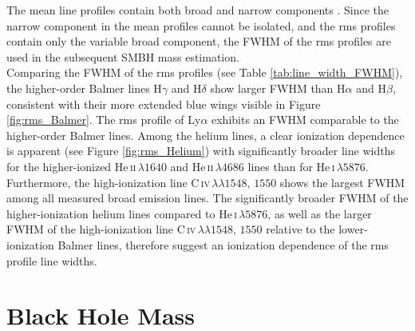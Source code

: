 The mean line profiles contain both broad and narrow components \parencite{peterson1997introduction}. Since the narrow component in the mean profiles cannot be isolated, and the rms profiles contain only the variable broad component, the FWHM of the rms profiles are used in the subsequent SMBH mass estimation.\\
Comparing the FWHM of the rms profiles (see Table \ref{tab:line_width_FWHM}), the higher-order Balmer lines H$\gamma$ and H$\delta$ show larger FWHM than H$\alpha$ and H$\beta$, consistent with their more extended blue wings visible in Figure \ref{fig:rms_Balmer}. The rms profile of Ly$\alpha$ exhibits an FWHM comparable to the higher-order Balmer lines. Among the helium lines, a clear ionization dependence is apparent (see Figure \ref{fig:rms_Helium}) with significantly broader line widths for the higher-ionized He\,\textsc{ii}\,$\lambda1640$ and He\,\textsc{ii}\,$\lambda4686$ lines than for He\,\textsc{i}\,$\lambda5876$. Furthermore, the high-ionization line C\,\textsc{iv}$\,\lambda\lambda 1548,\,1550$ shows the largest FWHM among all measured broad emission lines. The significantly broader FWHM of the higher-ionization helium lines compared to He\,\textsc{i}\,$\lambda5876$, as well as the larger FWHM of the high-ionization line C\,\textsc{iv}$\,\lambda\lambda 1548,\,1550$ relative to the lower-ionization Balmer lines, therefore suggest an ionization dependence of the rms profile line widths.


\section{Black Hole Mass}

